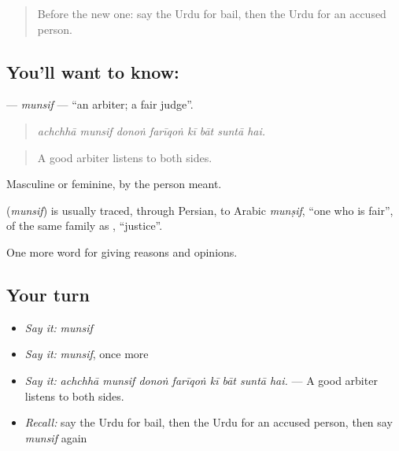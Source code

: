 \label{lesson:UR-C340-munsif}



\begin{quote}
Before the new one: say the Urdu for bail, then the Urdu for an accused person.
\end{quote}

\subsection*{You'll want to know: }
\textbf{} — \emph{munsif} — \textquotedblleft{}an arbiter; a fair judge\textquotedblright{}.

\begin{quote}
       
\end{quote}

\begin{quote}
\emph{achchhā munsif donoṅ farīqoṅ kī bāt suntā hai.}
\end{quote}

\begin{quote}
A good arbiter listens to both sides.
\end{quote}

Masculine or feminine, by the person meant.

\begin{cousinweb}
\textbf{} (\emph{munsif}) is usually traced, through Persian, to Arabic \emph{munṣif}, \textquotedblleft{}one who is fair\textquotedblright{}, of the same family as \textbf{}, \textquotedblleft{}justice\textquotedblright{}.
\end{cousinweb}

\begin{grammarlens}[title={What you've built}]
One more word for giving reasons and opinions.
\end{grammarlens}

\subsection*{Your turn}
\begin{itemize}
\raggedright
  \item \emph{Say it:} \emph{munsif}
  \item \emph{Say it:} \emph{munsif}, once more
  \item \emph{Say it:} \emph{achchhā munsif donoṅ farīqoṅ kī bāt suntā hai.} — A good arbiter listens to both sides.
  \item \emph{Recall:} say the Urdu for bail, then the Urdu for an accused person, then say \emph{munsif} again
\end{itemize}

